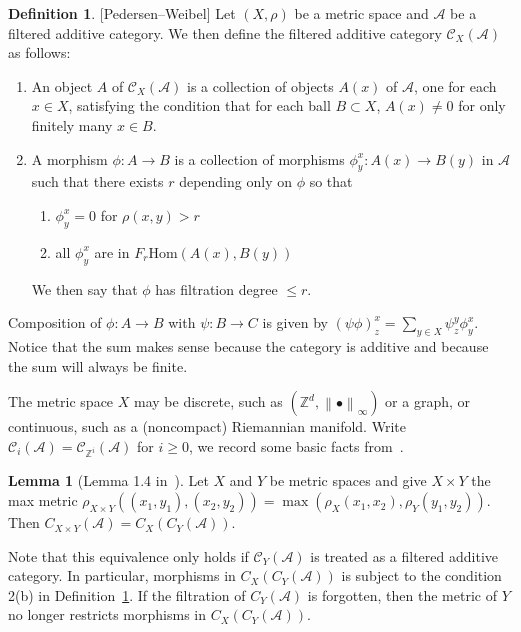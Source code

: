 \documentclass{article}
\theoremstyle{definition}
\newtheorem{defn}[theorem]{Definition}
\newtheorem{lemma}{Lemma}[section]
\newcommand{\CA}{{ \mathcal A}}
\newcommand{\ZZ}{{\mathbb Z}}
\newcommand\norm[1]{\left\lVert#1\right\rVert}
\begin{document}
\begin{defn} \label{defn: P-W Cat} [Pedersen--Weibel]
Let $(X, \rho)$ be a metric space and $\mathcal{A}$ be a filtered additive category. We then define the filtered additive category $\mathcal{C}_X(\mathcal{A})$ as follows:
\begin{enumerate}
    \item An object $A$ of $\mathcal{C}_X(\mathcal{A})$ is a collection of objects $A(x)$ of $\mathcal{A}$, one for each $x \in X$, satisfying the condition that for each ball $B \subset X$, $A(x) \ne 0$ for only finitely many $x \in B$.
    \item A morphism $\phi : A \rightarrow B$ is a collection of morphisms $\phi^x_y : A(x) \rightarrow B(y)$ in $\mathcal{A}$ such that there exists $r$ depending only on $\phi$ so that
    \begin{enumerate}
        \item $\phi^x_y = 0$ for $\rho(x, y) > r$
        \item all $\phi^x_y$ are in $F_r \mathrm{Hom}(A(x), B(y))$
    \end{enumerate}
    We then say that $\phi$ has filtration degree $\le r$.
\end{enumerate}

Composition of $\phi : A \rightarrow B$ with $\psi : B \rightarrow C$ is given by $(\psi \phi)^x_z = \sum_{y \in X} \psi^y_z \phi^x_y$. Notice that the sum makes sense because the category is additive and because the sum will always be finite. 
\end{defn}

The metric space \( X \) may be discrete, such as \( (\mathbb{Z}^d, \norm{\bullet}_\infty) \) or a graph, or continuous, such as a (noncompact) Riemannian manifold. Write $\mathcal C_i(\CA)= \mathcal C_{\ZZ^i}(\CA)$ for $i\geq 0$, we record some basic facts from~\cite{pedersen1982ki, pedersen2006nonconnective}.

\begin{lemma} [Lemma 1.4 in~\cite{pedersen1989k}]
Let $X$ and $Y$ be metric spaces and give $X \times Y$ the max metric
$\rho_{X \times Y}((x_1,y_1),(x_2,y_2)) = \max(\rho_X(x_1,x_2), \rho_Y(y_1,y_2))$.
Then $C_{X \times Y}(\mathcal{A}) = C_X(C_Y(\mathcal{A}))$.
\end{lemma}

Note that this equivalence only holds if $\mathcal{C}_Y(\CA)$ is treated as a filtered additive category. In particular, morphisms in $C_X(C_Y(\mathcal{A}))$ is subject to the condition 2(b) in Definition~\ref{defn: P-W Cat}. If the filtration of $C_Y(\mathcal{A})$ is forgotten, then the metric of $Y$ no longer restricts morphisms in $C_X(C_Y(\mathcal{A}))$. 
\end{document}
